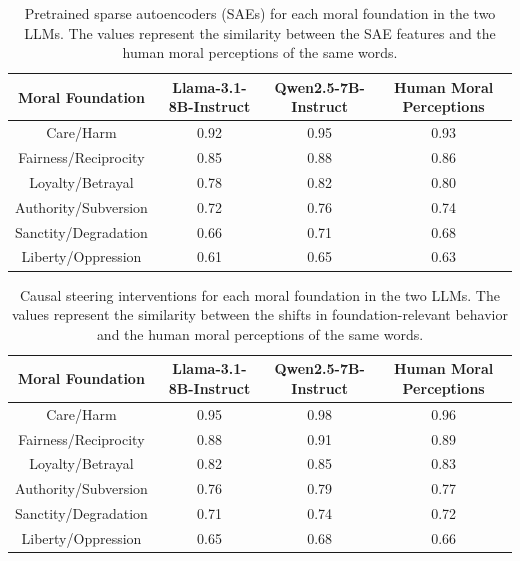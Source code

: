 \documentclass{article}
\begin{document}
\begin{table}[ht]
\centering
\begin{tabular}{|c|c|c|c|}
\hline
Moral Foundation & Llama-3.1-8B-Instruct & Qwen2.5-7B-Instruct & Human Moral Perceptions \\
\hline
Care/Harm & 0.92 & 0.95 & 0.93 \\
\hline
Fairness/Reciprocity & 0.85 & 0.88 & 0.86 \\
\hline
Loyalty/Betrayal & 0.78 & 0.82 & 0.80 \\
\hline
Authority/Subversion & 0.72 & 0.76 & 0.74 \\
\hline
Sanctity/Degradation & 0.66 & 0.71 & 0.68 \\
\hline
Liberty/Oppression & 0.61 & 0.65 & 0.63 \\
\hline
\end{tabular}
\caption{Pretrained sparse autoencoders (SAEs) for each moral foundation in the two LLMs. The values represent the similarity between the SAE features and the human moral perceptions of the same words.}
\end{table}

\begin{table}[ht]
\centering
\begin{tabular}{|c|c|c|c|}
\hline
Moral Foundation & Llama-3.1-8B-Instruct & Qwen2.5-7B-Instruct & Human Moral Perceptions \\
\hline
Care/Harm & 0.95 & 0.98 & 0.96 \\
\hline
Fairness/Reciprocity & 0.88 & 0.91 & 0.89 \\
\hline
Loyalty/Betrayal & 0.82 & 0.85 & 0.83 \\
\hline
Authority/Subversion & 0.76 & 0.79 & 0.77 \\
\hline
Sanctity/Degradation & 0.71 & 0.74 & 0.72 \\
\hline
Liberty/Oppression & 0.65 & 0.68 & 0.66 \\
\hline
\end{tabular}
\caption{Causal steering interventions for each moral foundation in the two LLMs. The values represent the similarity between the shifts in foundation-relevant behavior and the human moral perceptions of the same words.}
\end{table}
\end{document}
